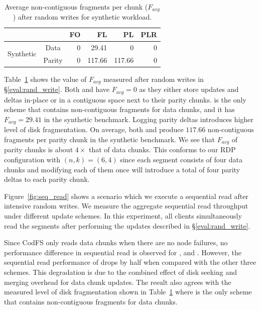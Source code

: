 \begin{table}[t]
  \centering
        \begin{tabular}{ccrrrr}
        \toprule
        & & FO    & FL    & PL    & PLR \\ \hline
        \multirow{2}[0]{*}{Synthetic} & Data  & 0     & 29.41 & 0     & 0 \\ 
              & Parity & 0     & 117.66 & 117.66 & 0 \\ 
        \bottomrule
        \end{tabular}%
        \caption{Average non-contiguous fragments per chunk 
            ($F_{avg}$) after random writes for synthetic workload.}
  \label{table:synthetic_fragmentation}%
\end{table}%

Table~\ref{table:synthetic_fragmentation} shows the value of $F_{avg}$
measured after random writes in \S\ref{eval:rand_write}.  Both \FO and \PLR have $F_{avg} = 0$
as they either store updates and deltas in-place or in a contiguous space next
to their parity chunks.  \FL is the only scheme that contains
non-contiguous fragments for data chunks, and it has $F_{avg} = 29.41$ in the
synthetic benchmark. 
Logging parity deltas introduces higher level of disk fragmentation. On
average, both \FL and \PL produce $117.66$ non-contiguous fragments per parity
chunk in the synthetic benchmark. We see that $F_{avg}$ of parity chunks is
about $4\times$ that of data chunks. This conforms to our RDP configuration
with $(n,k)=(6,4)$ since each segment consists of four data chunks and modifying
each of them once will introduce a total of four parity deltas to each parity
chunk. 

Figure~\ref{fig:seq_read} shows a scenario which we execute a sequential read
after intensive random writes. We measure the aggregate sequential read
throughput under different update schemes.  In this experiment, all clients
simultaneously read the segments after performing the updates described in
\S\ref{eval:rand_write}.

Since CodFS only reads data chunks when there are no node failures, no
performance difference in sequential read is observed for \FO, \PL and \PLR.
However,  the sequential read performance of \FL drops by half when
compared with the other three schemes. This degradation is due to the combined
effect of disk seeking and merging overhead for data chunk updates. The result
also agrees with the measured level of disk fragmentation shown in
Table~\ref{table:synthetic_fragmentation} where \FL is the only scheme that
contains non-contiguous fragments for data chunks.


